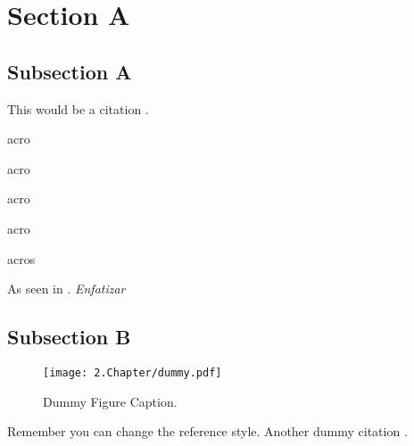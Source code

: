 \section{Section A}
\label{sec:sectiona}

\subsection{Subsection A}
\label{subsec:subasectionA}

This would be a citation \cite{dummy}.

\ac{acro} 

\acf{acro}

\acs{acro}

\acl{acro}

\acp{acro}

As seen in \cite{wiki}. \emph{Enfatizar}

\subsection{Subsection B}
\label{subsec:subbsectiona}

\begin{figure}[H]
	\centering
		\texttt{[image: 2.Chapter/dummy.pdf]}
	\caption[Dummy Figure Caption for List of Figures.]{Dummy Figure Caption.}
	\label{fig:dummyfigure1}
\end{figure}

Remember you can change the reference style. Another dummy citation \cite{site}.